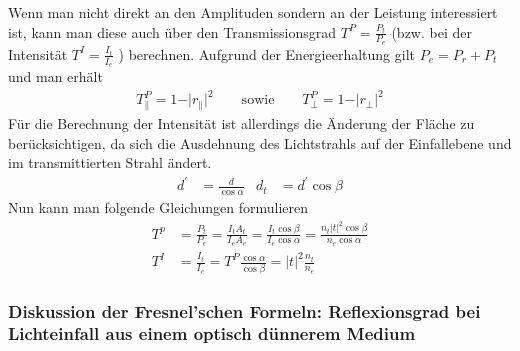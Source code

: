 Wenn man nicht direkt an den Amplituden sondern an der
Leistung interessiert ist, kann man diese auch über den
Transmissionsgrad $T^P=\frac{P_t}{P_e}$ 
(bzw. bei der Intensität
$T^{I}=\frac{I_t}{I_e}$%
%
%
)
berechnen. Aufgrund der Energieerhaltung gilt $P_e=P_r+P_t$ und man
erhält
\begin{gather*}
  T_{\parallel}^P = 1-\vert r_{\parallel}\vert^2
  \qquad\text{sowie}\qquad
  T_{\bot}^P = 1-\vert r_{\bot}\vert^2
\end{gather*}
Für die Berechnung der Intensität ist allerdings die Änderung der
Fläche zu berücksichtigen, da sich die Ausdehnung des Lichtstrahls auf
der Einfallebene und im transmittierten Strahl ändert.
\begin{align*}
  d^\prime &= \frac{d}{\cos\alpha}
  &d_t &= d^\prime\cos\beta 	
\end{align*}
Nun kann man folgende Gleichungen formulieren
\begin{align*}
  T^p &=\frac{P_t}{P_e}
        =\frac{I_t A_t}{I_e A_e}
        =\frac{I_t \cos\beta}{I_e\cos\alpha}
        =\frac{n_t |t|^2 \cos\beta}{n_e\cos\alpha}\\
  T^{I}&=\frac{I_t}{I_e}
         =T^P\frac{\cos\alpha}{\cos\beta}
         = |t|^2\frac{n_t}{n_e}
\end{align*}

\subsubsection[Folgen der Fresnel'schen Formeln]
{Diskussion der Fresnel'schen Formeln: Reflexionsgrad
  bei Lichteinfall aus einem optisch dünnerem Medium}

